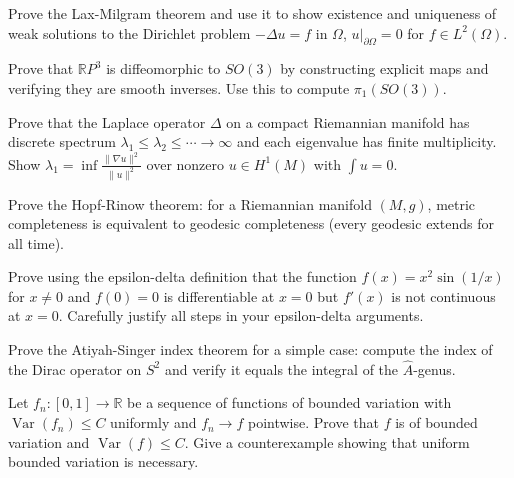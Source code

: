\documentclass[12pt,a4paper]{exam}
\begin{document}
\begin{questions}
\vspace{0.3cm}

\question[5]
Prove the Lax-Milgram theorem and use it to show existence and uniqueness of weak solutions to the Dirichlet problem $-\Delta u = f$ in $\Omega$, $u|_{\partial\Omega} = 0$ for $f \in L^2(\Omega)$.

\vspace{0.3cm}

\question[3]
Prove that $\mathbb{R}P^3$ is diffeomorphic to $SO(3)$ by constructing explicit maps and verifying they are smooth inverses. Use this to compute $\pi_1(SO(3))$.

\vspace{0.3cm}

\question[5]
Prove that the Laplace operator $\Delta$ on a compact Riemannian manifold has discrete spectrum $\lambda_1 \leq \lambda_2 \leq \cdots \to \infty$ and each eigenvalue has finite multiplicity. Show $\lambda_1 = \inf \frac{\|\nabla u\|^2}{\|u\|^2}$ over nonzero $u \in H^1(M)$ with $\int u = 0$.

\vspace{0.3cm}

\question[4]
Prove the Hopf-Rinow theorem: for a Riemannian manifold $(M,g)$, metric completeness is equivalent to geodesic completeness (every geodesic extends for all time).

\vspace{0.3cm}

\question[3]
Prove using the epsilon-delta definition that the function $f(x) = x^2 \sin(1/x)$ for $x \neq 0$ and $f(0) = 0$ is differentiable at $x = 0$ but $f'(x)$ is not continuous at $x = 0$. Carefully justify all steps in your epsilon-delta arguments.

\vspace{0.3cm}

\question[5]
Prove the Atiyah-Singer index theorem for a simple case: compute the index of the Dirac operator on $S^2$ and verify it equals the integral of the $\widehat{A}$-genus.

\vspace{0.3cm}

\question[5]
Let $f_n: [0,1] \to \mathbb{R}$ be a sequence of functions of bounded variation with $\operatorname{Var}(f_n) \leq C$ uniformly and $f_n \to f$ pointwise. Prove that $f$ is of bounded variation and $\operatorname{Var}(f) \leq C$. Give a counterexample showing that uniform bounded variation is necessary.

\vspace{0.3cm}


\end{questions}
\end{document}
